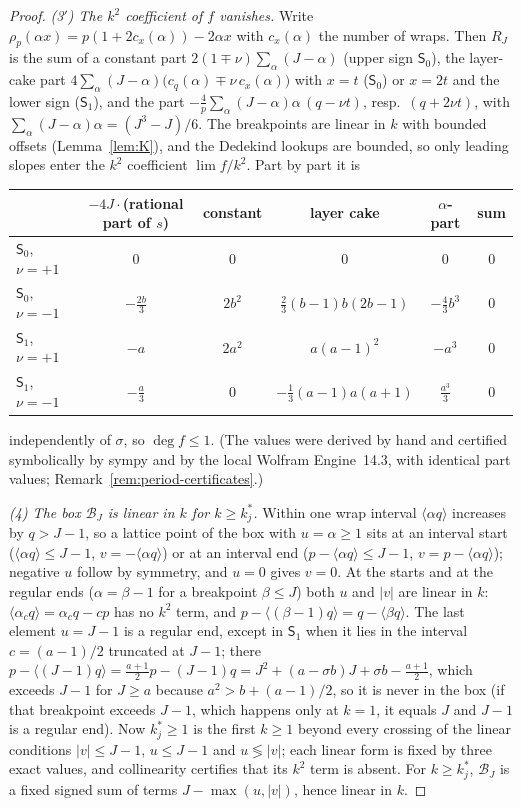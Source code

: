 \documentclass[11pt]{article}
\theoremstyle{definition}
\begin{document}
\begin{proof}
\emph{(3$'$) The $k^2$ coefficient of $f$ vanishes.}  Write
$\rho_p(\alpha x)=p(1+2c_x(\alpha))-2\alpha x$ with $c_x(\alpha)$ the
number of wraps.  Then $R_J$ is the sum of a constant part
$2(1\mp\nu)\sum_\alpha(J-\alpha)$ (upper sign $\mathsf S_0$), the
layer-cake part $4\sum_\alpha(J-\alpha)\bigl(c_q(\alpha)\mp\nu\,c_x(\alpha)\bigr)$
with $x=t$ ($\mathsf S_0$) or $x=2t$ and the lower sign
($\mathsf S_1$), and the part $-\frac4p\sum_\alpha(J-\alpha)\alpha\,(q-\nu t)$,
resp.\ $(q+2\nu t)$, with $\sum_\alpha(J-\alpha)\alpha=(J^3-J)/6$.  The
breakpoints are linear in $k$ with bounded offsets (Lemma~\ref{lem:K}),
and the Dedekind lookups are bounded, so only leading slopes enter the
$k^2$ coefficient $\lim f/k^2$.  Part by part it is
\begin{center}
\small
\begin{tabular}{@{}lccccc@{}}
\toprule
& $-4J\cdot$(rational part of $s$) & constant & layer cake & $\alpha$-part & sum\\
\midrule
$\mathsf S_0$, $\nu=+1$ & $0$ & $0$ & $0$ & $0$ & $0$\\
$\mathsf S_0$, $\nu=-1$ & $-\frac{2b}3$ & $2b^2$ & $\frac23(b-1)b(2b-1)$ & $-\frac43b^3$ & $0$\\
$\mathsf S_1$, $\nu=+1$ & $-a$ & $2a^2$ & $a(a-1)^2$ & $-a^3$ & $0$\\
$\mathsf S_1$, $\nu=-1$ & $-\frac a3$ & $0$ & $-\frac13(a-1)a(a+1)$ & $\frac{a^3}3$ & $0$\\
\bottomrule
\end{tabular}
\end{center}
independently of $\sigma$, so $\deg f\leq1$.  (The values were derived by
hand and certified symbolically by sympy and by the local Wolfram
Engine~14.3, with identical part values; Remark~\ref{rem:period-certificates}.)

\emph{(4) The box $\mathcal B_J$ is linear in $k$ for $k\geq k^*_j$.}
Within one wrap interval $\langle\alpha q\rangle$ increases by $q>J-1$,
so a lattice point of the box with $u=\alpha\geq1$ sits at an interval
start ($\langle\alpha q\rangle\leq J-1$, $v=-\langle\alpha q\rangle$) or
at an interval end ($p-\langle\alpha q\rangle\leq J-1$,
$v=p-\langle\alpha q\rangle$); negative $u$ follow by symmetry, and
$u=0$ gives $v=0$.  At the starts and at the regular ends
($\alpha=\beta-1$ for a breakpoint $\beta\leq J$) both $u$ and $|v|$ are
linear in $k$: $\langle\alpha_cq\rangle=\alpha_cq-cp$ has no $k^2$ term,
and $p-\langle(\beta-1)q\rangle=q-\langle\beta q\rangle$.  The last
element $u=J-1$ is a regular end, except in $\mathsf S_1$ when it lies
in the interval $c=(a-1)/2$ truncated at $J-1$; there
$p-\langle(J-1)q\rangle=\tfrac{a+1}2p-(J-1)q=J^2+(a-\sigma b)J+\sigma b-\tfrac{a+1}2$,
which exceeds $J-1$ for $J\geq a$ because $a^2>b+(a-1)/2$, so it is
never in the box (if that breakpoint exceeds $J-1$, which happens only
at $k=1$, it equals $J$ and $J-1$ is a regular end).  Now $k^*_j\geq1$ is
the first $k\geq1$ beyond every crossing of the linear conditions $|v|\leq J-1$,
$u\leq J-1$ and $u\lessgtr|v|$; each linear form is fixed by three exact
values, and collinearity certifies that its $k^2$ term is absent.  For
$k\geq k^*_j$, $\mathcal B_J$ is a fixed signed sum of terms
$J-\max(u,|v|)$, hence linear in $k$.


\end{proof}
\end{document}
